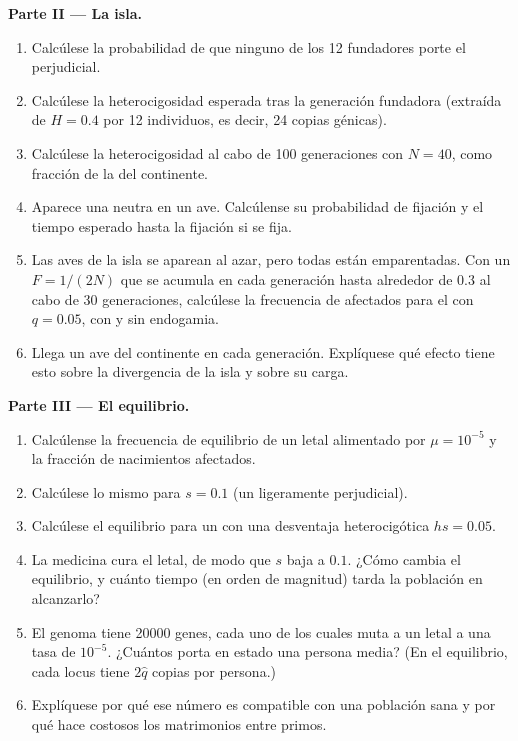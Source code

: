 \begin{problem}
\medskip
\noindent\textbf{Parte II --- La isla.}
\begin{enumerate}[resume]
  \item Calcúlese la probabilidad de que ninguno de los 12 fundadores porte
        el  perjudicial.
  \item Calcúlese la heterocigosidad esperada tras la generación fundadora
        (extraída de $H = 0.4$ por 12 individuos, es decir, 24 copias
        génicas).
  \item Calcúlese la heterocigosidad al cabo de 100 generaciones con $N =
        40$, como fracción de la del continente.
  \item Aparece una  neutra en un ave. Calcúlense su probabilidad
        de fijación y el tiempo esperado hasta la fijación si se fija.
  \item Las aves de la isla se aparean al azar, pero todas están
        emparentadas. Con un $F = 1/(2N)$ que se acumula en cada generación
        hasta alrededor de $0.3$ al cabo de 30 generaciones, calcúlese la
        frecuencia de  afectados para el  con $q = 0.05$,
        con y sin endogamia.
  \item Llega un ave del continente en cada generación. Explíquese qué
        efecto tiene esto sobre la divergencia de la isla y sobre su carga.
\end{enumerate}

\medskip
\noindent\textbf{Parte III --- El equilibrio.}
\begin{enumerate}[resume]
  \item Calcúlense la frecuencia de equilibrio de un letal 
        alimentado por $\mu = 10^{-5}$ y la fracción de nacimientos
        afectados.
  \item Calcúlese lo mismo para $s = 0.1$ (un  ligeramente
        perjudicial).
  \item Calcúlese el equilibrio para un   con una desventaja
        heterocigótica $hs = 0.05$.
  \item La medicina cura el letal, de modo que $s$ baja a $0.1$. ¿Cómo
        cambia el equilibrio, y cuánto tiempo (en orden de magnitud) tarda
        la población en alcanzarlo?
  \item El genoma tiene \num{20000} genes, cada uno de los cuales muta a un
        letal  a una tasa de $10^{-5}$. ¿Cuántos 
        porta en estado  una persona media? (En el equilibrio,
        cada locus tiene $2\hat q$ copias por persona.)
  \item Explíquese por qué ese número es compatible con una población sana
        y por qué hace costosos los matrimonios entre primos.
\end{enumerate}


\end{problem}
